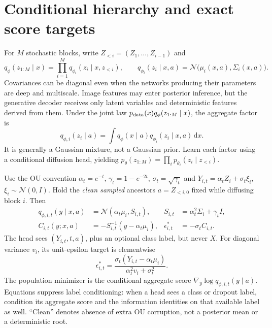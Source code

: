 \documentclass[10pt]{article}
\newcommand{\N}{\mathcal N}
\newcommand{\dd}{\mathrm d}
\begin{document}
\section{Conditional hierarchy and exact score targets}
For $M$ stochastic blocks, write $Z_{<i}=(Z_1,\ldots,Z_{i-1})$ and
\begin{equation}
q_\phi(z_{1:M}\mid x)=\prod_{i=1}^M q_{\phi_i}(z_i\mid x,z_{<i}),\qquad
q_{\phi_i}(z_i\mid x,a)=\N\bigl(\mu_i(x,a),\Sigma_i(x,a)\bigr).
\label{eq:encoder}
\end{equation}
Covariances can be diagonal even when the networks producing their parameters are deep and multiscale. Image features may enter posterior inference, but the generative decoder receives only latent variables and deterministic features derived from them. Under the joint law $p_{\rm data}(x)q_\phi(z_{1:M}\mid x)$, the aggregate factor is
\begin{equation}
q_{\phi,i}(z_i\mid a)=\int q_\phi(x\mid a)q_{\phi_i}(z_i\mid x,a)\,\dd x.
\label{eq:aggregate}
\end{equation}
It is generally a Gaussian mixture, not a Gaussian prior. Learn each factor using a conditional diffusion head, yielding $p_\theta(z_{1:M})=\prod_i p_{\theta_i}(z_i\mid z_{<i})$.

Use the OU convention $\alpha_t=e^{-t}$, $\gamma_t=1-e^{-2t}$, $\sigma_t=\sqrt{\gamma_t}$ and $Y_{i,t}=\alpha_tZ_i+\sigma_t\xi_i$, $\xi_i\sim\N(0,I)$. Hold the \emph{clean sampled} ancestors $a=Z_{<i,0}$ fixed while diffusing block $i$. Then
\begin{align}
q_{\phi,i,t}(y\mid x,a)&=\N(\alpha_t\mu_i,S_{i,t}), & S_{i,t}&=\alpha_t^2\Sigma_i+\gamma_tI,\\
C_{i,t}(y;x,a)&=-S_{i,t}^{-1}(y-\alpha_t\mu_i), & \epsilon^*_{i,t}&=-\sigma_t C_{i,t}.
\label{eq:targets}
\end{align}
The head sees $(Y_{i,t},t,a)$, plus an optional class label, but never $X$. For diagonal variance $v_i$, its unit-epsilon target is elementwise
\begin{equation}
\epsilon^*_{i,t}=\frac{\sigma_t(Y_{i,t}-\alpha_t\mu_i)}{\alpha_t^2v_i+\sigma_t^2}.
\label{eq:eps}
\end{equation}
The population minimizer is the conditional aggregate score $\nabla_y\log q_{\phi,i,t}(y\mid a)$. Equations suppress label conditioning: when a head sees a class or dropout label, condition its aggregate score and the information identities on that available label as well. ``Clean'' denotes absence of extra OU corruption, not a posterior mean or a deterministic root.
\end{document}
